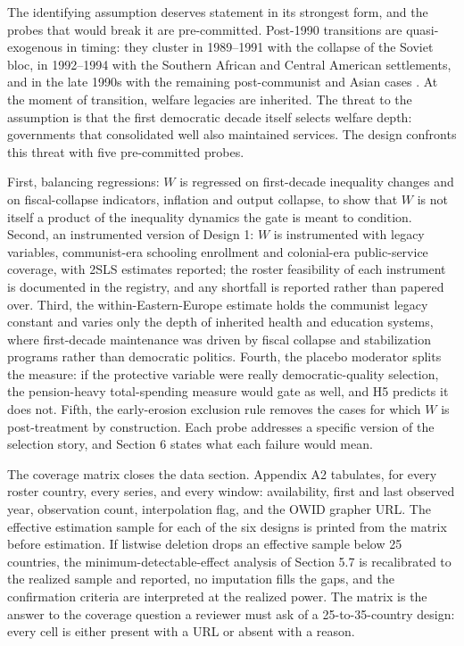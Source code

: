 The identifying assumption deserves statement in its strongest form, and the probes that would break it are pre-committed. Post-1990 transitions are quasi-exogenous in timing: they cluster in 1989--1991 with the collapse of the Soviet bloc, in 1992--1994 with the Southern African and Central American settlements, and in the late 1990s with the remaining post-communist and Asian cases \citep{LuhrmannTannenberg2018}. At the moment of transition, welfare legacies are inherited. The threat to the assumption is that the first democratic decade itself selects welfare depth: governments that consolidated well also maintained services. The design confronts this threat with five pre-committed probes.

First, balancing regressions: $W$ is regressed on first-decade inequality changes and on fiscal-collapse indicators, inflation and output collapse, to show that $W$ is not itself a product of the inequality dynamics the gate is meant to condition. Second, an instrumented version of Design 1: $W$ is instrumented with legacy variables, communist-era schooling enrollment and colonial-era public-service coverage, with 2SLS estimates reported; the roster feasibility of each instrument is documented in the registry, and any shortfall is reported rather than papered over. Third, the within-Eastern-Europe estimate holds the communist legacy constant and varies only the depth of inherited health and education systems, where first-decade maintenance was driven by fiscal collapse and stabilization programs rather than democratic politics. Fourth, the placebo moderator splits the measure: if the protective variable were really democratic-quality selection, the pension-heavy total-spending measure would gate as well, and H5 predicts it does not. Fifth, the early-erosion exclusion rule removes the cases for which $W$ is post-treatment by construction. Each probe addresses a specific version of the selection story, and Section 6 states what each failure would mean.

The coverage matrix closes the data section. Appendix A2 tabulates, for every roster country, every series, and every window: availability, first and last observed year, observation count, interpolation flag, and the OWID grapher URL. The effective estimation sample for each of the six designs is printed from the matrix before estimation. If listwise deletion drops an effective sample below 25 countries, the minimum-detectable-effect analysis of Section 5.7 is recalibrated to the realized sample and reported, no imputation fills the gaps, and the confirmation criteria are interpreted at the realized power. The matrix is the answer to the coverage question a reviewer must ask of a 25-to-35-country design: every cell is either present with a URL or absent with a reason.

